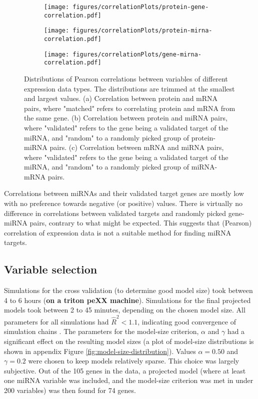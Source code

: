 \begin{figure}[!h]
  \centering
  \begin{subfigure}{.45\textwidth}
    \centering
    \texttt{[image: figures/correlationPlots/protein-gene-correlation.pdf]}
    \subcaption{ \label{fig:protein-gene-cor}}
  \end{subfigure}
  \begin{subfigure}{.45\textwidth}
    \centering
    \texttt{[image: figures/correlationPlots/protein-mirna-correlation.pdf]}
    \subcaption{ \label{fig:protein-mirna-cor}}
  \end{subfigure}
  \begin{subfigure}{.45\textwidth}
    \texttt{[image: figures/correlationPlots/gene-mirna-correlation.pdf]}
    \subcaption{ \label{fig:gene-mirna-cor}}
  \end{subfigure}

  \caption{Distributions of Pearson correlations between variables of different expression data types.
  The distributions are trimmed at the smallest and largest values.
  (a) Correlation between protein and mRNA pairs, where "matched" refers to correlating
  protein and mRNA from the same gene. (b) Correlation between protein and miRNA pairs,
  where "validated" refers to the gene being a validated target of the miRNA, and
  "random" to a randomly picked group of protein-miRNA pairs.
  (c) Correlation between mRNA and miRNA pairs,
  where "validated" refers to the gene being a validated target of the miRNA, and
  "random" to a randomly picked group of miRNA-mRNA pairs.}
  \label{fig:correlations}
\end{figure}

Correlations between miRNAs and their validated target genes are mostly low
with no preference towards negative (or positive) values. There is virtually
no difference in correlations between validated targets and randomly picked
gene-miRNA pairs, contrary to what might be expected. This suggests that
(Pearson) correlation of expression data is not a suitable method for finding
miRNA targets.


\subsection{Variable selection}

Simulations for the cross validation (to determine good model size) took
between 4 to 6 hours (\textbf{on a triton peXX machine}). Simulations for the
final projected models took between 2 to 45 minutes, depending on the chosen
model size. All parameters for all simulations had $\hat{R}^2 < 1.1$,
indicating good convergence of simulation chains \citep{Gelman2013}. The
parameters for the model-size criterion, $\alpha$ and $\gamma$ had a
significant effect on the resulting model sizes (a plot of model-size
distributions is shown in appendix Figure \ref{fig:model-size-distribution}).
Values $\alpha = 0.50$ and
$\gamma = 0.2$ were chosen to keep models relatively sparse. This choice was
largely subjective. Out of the 105 genes in the data, a projected model (where
at least one miRNA variable was included, and the model-size criterion was met
in under 200 variables) was then found for 74 genes.

